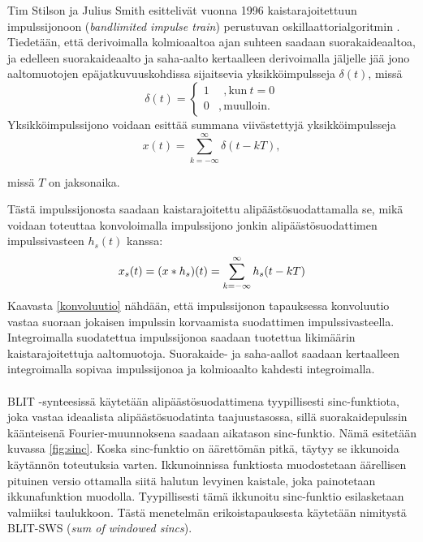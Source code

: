 \documentclass[finnish,12pt,a4paper,pdftex]{article} %
\begin{document}
Tim Stilson ja Julius Smith esittelivät vuonna 1996 kaistarajoitettuun impulssijonoon (\textit{bandlimited impulse train}) perustuvan oskillaattorialgoritmin \cite{Stilson1996}. Tiedetään, että derivoimalla kolmioaaltoa ajan suhteen saadaan suorakaideaaltoa, ja edelleen suorakaideaalto ja saha-aalto kertaalleen derivoimalla jäljelle jää jono aaltomuotojen epäjatkuvuuskohdissa sijaitsevia yksikköimpulsseja $\delta(t)$, missä
\begin{equation}
\delta(t) = \left\{
  \begin{array}{lr}
    1 & \ \ , \text{kun} \ t = 0 \\
    0 & ,\text{muulloin}.
  \end{array}
\right.
\end{equation}
Yksikköimpulssijono voidaan esittää summana viivästettyjä yksikköimpulsseja
\begin{equation}
x(t) = \sum_{k=-\infty}^{\infty}\delta(t-kT),
\end{equation}
\begin{center}
missä $T$ on jaksonaika.
\end{center}
Tästä impulssijonosta saadaan kaistarajoitettu alipäästösuodattamalla se, mikä voidaan toteuttaa konvoloimalla impulssijono jonkin alipäästösuodattimen impulssivasteen $h_{s}(t)$ kanssa:
\begin{equation} \label{konvoluutio}
x_{s}(t) = (x * h_{s})(t) = \sum_{k=-\infty}^{\infty}h_s(t-kT) \vspace{1mm}
\end{equation}
Kaavasta \ref{konvoluutio} nähdään, että impulssijonon tapauksessa konvoluutio vastaa suoraan jokaisen impulssin korvaamista suodattimen impulssivasteella. Integroimalla suodatettua impulssijonoa saadaan tuotettua likimäärin kaistarajoitettuja aaltomuotoja. Suorakaide- ja saha-aallot saadaan kertaalleen integroimalla sopivaa impulssijonoa ja kolmioaalto kahdesti integroimalla. \cite{Valimaki2007, Pekonen2014, Stilson1996} \\\\
BLIT -synteesissä käytetään alipäästösuodattimena tyypillisesti sinc-funktiota, joka vastaa ideaalista alipäästösuodatinta taajuustasossa, sillä suorakaidepulssin käänteisenä Fourier-muunnoksena saadaan aikatason sinc-funktio. Nämä esitetään kuvassa \ref{fig:sinc}. Koska sinc-funktio on äärettömän pitkä, täytyy se ikkunoida käytännön toteutuksia varten. Ikkunoinnissa funktiosta muodostetaan äärellisen pituinen versio ottamalla siitä halutun levyinen kaistale, joka painotetaan ikkunafunktion muodolla. Tyypillisesti tämä ikkunoitu sinc-funktio esilasketaan valmiiksi taulukkoon. Tästä menetelmän erikoistapauksesta käytetään nimitystä BLIT-SWS (\textit{sum of windowed sincs}). \cite{Valimaki2007, Stilson1996}
\end{document}
